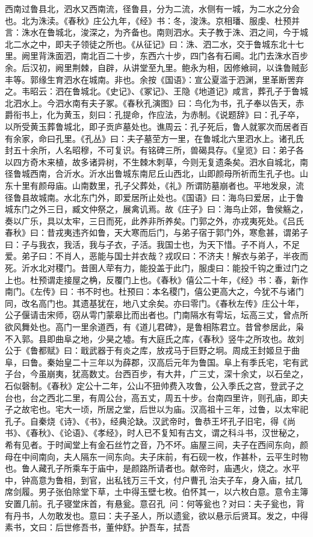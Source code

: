 \documentclass[12pt,UTF8]{ctexbook}
\begin{document}
西南过鲁县北，泗水又西南流，径鲁县，分为二流，水侧有一城，为二水之分会也。北为洙渎。《春秋》庄公九年，《经》书：冬，浚洙。京相璠、服虔、杜预并言：洙水在鲁城北，浚深之，为齐备也。南则泗水。夫子教于洙、泗之间，今于城北二水之中，即夫子领徒之所也。《从征记》曰：洙、泗二水，交于鲁城东北十七里。阙里背洙面泗，南北百二十步，东西六十步，四门各有石阃。北门去洙水百步余。后汉初，阙里荆棘，自辟，从讲堂至九里。鲍永为相，因修飨祠，以诛鲁贼彭丰等。郭缘生育泗水在城南。非也。余按《国语》：宣公夏滥于泗渊，里革断罟弃之。韦昭云：泗在鲁城北。《史记》、《冢记》、王隐《地道记》咸言，葬孔子于鲁城北泗水上。今泗水南有夫子冢。《春秋孔演图》曰：鸟化为书，孔子奉以告天，赤爵衔书上，化为黄玉，刻曰：孔提命，作应法，为赤制。《说题辞》曰：孔子卒，以所受黄玉葬鲁城北，即子贡庐墓处也。谯周云：孔子死后，鲁人就冢次而居者百有余家，命曰孔里。《孔丛》曰：夫子墓茔方一里，在鲁城北六里泗水上。诸孔氏封五十余所，人名昭穆，不可复识。有铭碑三所，兽碣具存。《皇览》曰：弟子各以四方奇木来植，故多诸异树，不生棘木刺草，今则无复遗条矣。泗水自城北，南径鲁城西南，合沂水。沂水出鲁城东南尼丘山西北，山即颜母所祈而生孔子也。山东十里有颜母庙。山南数里，孔子父葬处，《礼》所谓防墓崩者也。平地发泉，流径鲁县故城南。水北东门外，即爱居所止处也。《国语》曰：海鸟曰爱居，止于鲁城东门之外三日，臧文仲祭之，展禽讥焉。故《庄子》曰：海鸟止郊，鲁侯觞之，奏以广乐，具以太牢，三日而死，此养非所养矣。门郭之外，亦戎夷死处。《吕氏春秋》曰：昔戎夷违齐如鲁，天大寒而后门，与弟子宿于郭门外，寒愈甚，谓弟子曰：子与我衣，我活，我与子衣，子活。我国士也，为天下惜。子不肖人，不足爱。弟子曰：不肖人，恶能与国士并衣哉？戎叹曰：不济夫！解衣与弟子，半夜而死。沂水北对稷门。昔圉人荦有力，能投盖于此门，服虔曰：能投千钩之重过门之上也。杜预谓走接屋之桷，反覆门上也。《春秋》僖公二十年，《经》书：春，新作南门。《左传》曰：书不时也。杜预曰：本名稷门，僖公更高大之，今犹不与诸门同，改名高门也。其遗基犹在，地八丈余矣。亦曰零门。《春秋左传》庄公十年，公子偃请击宋师，窃从雩门蒙皋比而出者也。门南隔水有雩坛，坛高三丈，曾点所欲风舞处也。高门一里余道西，有《道儿君碑》，是鲁相陈君立。昔曾参居此，枭不入郭。县即曲阜之地，少昊之墟。有大庭氏之库，《春秋》竖牛之所攻也。故刘公于《鲁都赋》曰：戢武器于有炎之库，放戎马于巨野之坰。周成王封姬旦于曲阜，曰鲁。秦始皇二十三年以为薛郡，汉高后元年为鲁国。阜上有季氏宅，宅有武子台，今虽崩夷，犹高数丈。台西百步，有大井，广三丈，深十余丈，以石垒之，石似磬制。《春秋》定公十二年，公山不狃帅费入攻鲁，公入季氏之宫，登武子之台也，台之西北二里，有周公台，高五丈，周五十步。台南四里许，则孔庙，即夫子之故宅也。宅大一顷，所居之堂，后世以为庙。汉高祖十三年，过鲁，以太牢祀孔子。自秦烧《诗》、《书》，经典沦缺。汉武帝时，鲁恭王坏孔子旧宅，得《尚书》、《春秋》、《论语》、《孝经》，时人已不复知有古文，谓之科斗书，汉世秘之，希有见者。于时闻堂上有金石丝竹之音，乃不坏。庙屋三间，夫子在西间东向，颜母在中间南向，夫人隔东一间东向。夫子床前，有石砚一枚，作甚朴，云平生时物也。鲁人藏孔子所乘车于庙中，是颜路所请者也。献帝时，庙遇火，烧之。水平中，钟高意为鲁相，到官，出私钱万三千文，付户曹孔治夫子车，身入庙，拭几席剑履。男子张伯除堂下草，土中得玉壁七枚。伯怀其一，以六枚白意。意令主簿安置几前。孔子寝堂床首，有悬瓮。意召孔，问：何等瓮也？对曰：夫子瓮也，背有丹书，人勿敢发也。意曰：夫子圣人，所以遗瓮，欲以悬示后贤耳。发之，中得素书，文曰：后世修吾书，董仲舒。护吾车，拭吾
\end{document}
